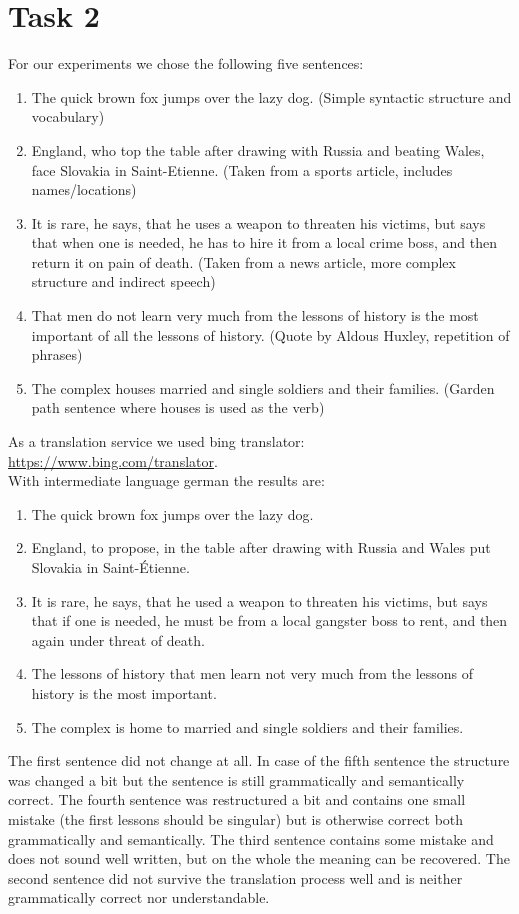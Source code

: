 \documentclass[%
   11pt,              %
   ngerman,           %
   a4paper,           %
   DIV11,             %
]{scrartcl}%
\begin{document}
\section*{Task 2}
For our experiments we chose the following five sentences:
\begin{enumerate}
	\item The quick brown fox jumps over the lazy dog. (Simple syntactic structure and vocabulary)
	\item England, who top the table after drawing with Russia and beating Wales, face Slovakia in Saint-Etienne. (Taken from a sports article, includes names/locations)
	\item It is rare, he says, that he uses a weapon to threaten his victims, but says that when one is needed, he has to hire it from a local crime boss, and then return it on pain of death. (Taken from a news article, more complex structure and indirect speech)
	\item That men do not learn very much from the lessons of history is the most important of all the lessons of history. (Quote by Aldous Huxley, repetition of phrases)
	\item The complex houses married and single soldiers and their families. (Garden path sentence where houses is used as the verb)
\end{enumerate}
As a translation service we used bing translator: \url{https://www.bing.com/translator}. \\
With intermediate language german the results are:
\begin{enumerate}
	\item The quick brown fox jumps over the lazy dog.
	\item England, to propose, in the table after drawing with Russia and Wales put Slovakia in Saint-Étienne.
	\item It is rare, he says, that he used a weapon to threaten his victims, but says that if one is needed, he must be from a local gangster boss to rent, and then again under threat of death.
	\item The lessons of history that men learn not very much from the lessons of history is the most important.
	\item The complex is home to married and single soldiers and their families.
\end{enumerate}
The first sentence did not change at all. In case of the fifth sentence the structure was changed a bit but the sentence is still grammatically and semantically correct. The fourth sentence was restructured a bit and contains one small mistake (the first lessons should be singular) but is otherwise correct both grammatically and semantically. The third sentence contains some mistake and does not sound well written, but on the whole the meaning can be recovered. The second sentence did not survive the translation process well and is neither grammatically correct nor understandable. \par
\end{document}
